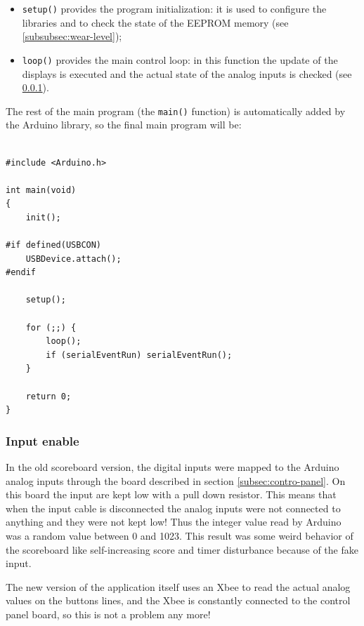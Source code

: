 \documentclass[11pt,english]{article}
\newcommand{\code}[1]{\texttt{#1}}
\begin{document}
\begin{itemize}
\item \code{setup()} provides the program initialization: it is used to configure the libraries
      and to check the state of the EEPROM memory (see \ref{subsubsec:wear-level});

\item \code{loop()} provides the main control loop: in this function the update of the displays is 
      executed and the actual state of the analog inputs is checked (see \ref{subsubsec:input-enable}).
\end{itemize}

The rest of the main program (the \code{main()} function) is automatically added by the Arduino library, 
so the final main program will be:

%
\begin{lstlisting}[label=lis:main-loop,caption=Main program from Arduino library]

#include <Arduino.h>

int main(void)
{
    init();

#if defined(USBCON)
    USBDevice.attach();
#endif
    
    setup();
    
    for (;;) {
        loop();
        if (serialEventRun) serialEventRun();
    }
        
    return 0;
}
\end{lstlisting}


\subsubsection{Input enable} \label{subsubsec:input-enable}

In the old scoreboard version, the digital inputs were mapped to the Arduino analog inputs through the 
board described in section \ref{subsec:contro-panel}. On this board the input are kept low with a pull 
down resistor. This means that when the input cable is disconnected the analog inputs were not connected 
to anything and they were not kept low! Thus the integer value read by Arduino was a random value between 
0 and 1023. This result was some weird behavior of the scoreboard like self-increasing score and timer 
disturbance because of the fake input.

The new version of the application itself uses an Xbee to read the actual analog values on the buttons lines,
and the Xbee is constantly connected to the control panel board, so this is not a problem any more! 
\end{document}
